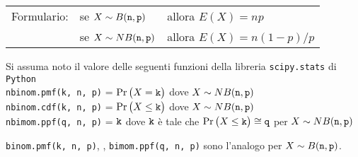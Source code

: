 \documentclass[11pt,twoside,a4paper]{article}
\begin{document}
\vfill
\hrulefill

\begin{tabular}{@{}lll}
Formulario:& se $X\sim B({\tt n},{\tt p})$ & allora $E(X)=np$\\
           & se $X\sim NB({\tt n},{\tt p})$& allora $E(X)=n(1-p)/p$
\end{tabular}

Si assuma noto il valore delle seguenti funzioni della libreria {\tt scipy.stats\/} di  {\tt Python\/}\\
{\tt nbinom.pmf(k, n, p)} = $\Pr\big(X={\tt k}\big)$ dove $X\sim NB({\tt n},{\tt p})$\\
{\tt nbinom.cdf(k, n, p)} = $\Pr\big(X\le{\tt k}\big)$ dove  $X\sim NB({\tt n},{\tt p})$ \\
{\tt nbimom.ppf(q, n, p)} = ${\tt k}$ dove ${\tt k}$ è tale che $\Pr\big(X\le{\tt k}\big)\cong{\tt q}$ per $X\sim NB({\tt n},{\tt p})$ 

{\tt binom.pmf(k, n, p)}, {\tt }, {\tt bimom.ppf(q, n, p)} sono l'analogo per $X\sim B({\tt n},{\tt p})$.
\end{document}
